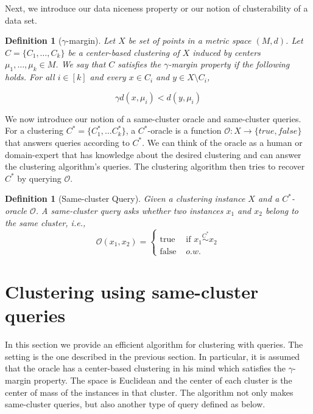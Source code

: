 \documentclass[12pt]{article}
\newcommand{\mc}{\mathcal}
\newtheorem{definition}[theorem]{Definition}
\begin{document}
Next, we introduce our data niceness property or our notion of clusterability of a data set.

\begin{definition}[$\gamma$-margin]
\label{defn:alphacp}
Let $X$ be set of points in a metric space $(M, d)$. Let $C = \{C_1, \ldots, C_k\}$ be a center-based clustering of $X$ induced by centers $\mu_1, \ldots, \mu_k \in M$. We say that $C$ satisfies the $\gamma$-margin property if the following holds. For all $i \in [k]$ and every $x \in C_i$ and $y \in X \setminus C_i$,

$$\gamma d(x, \mu_i) < d(y, \mu_i)$$
\end{definition}


We now introduce our notion of a same-cluster oracle and same-cluster queries. For a clustering $C^*=\{ C^*_1, \ldots C^*_k\}$, a $C^*$-oracle is a function ${\mc O} : X \rightarrow \{true, false\}$ that answers queries according to $C^*$. We can think of the oracle as a human or domain-expert that has knowledge about the desired clustering and can answer the clustering algorithm's queries. The clustering algorithm then tries to recover $C^*$ by querying $\mc O$.

\begin{definition}[Same-cluster Query]
Given a clustering instance $X$ and a $C^*$-oracle $\mc O$. A same-cluster query asks whether two instances $x_1$ and $x_2$ belong to the same cluster, i.e., 
$$\mc O(x_1, x_2) = \left\{
	\begin{array}{ll}
		\mbox{true }  & \mbox{if } x_1 \overset{C^*}{\sim} x_2   \\
		\mbox{false } & o.w. 
	\end{array}
\right. $$
\end{definition}

\section{Clustering using same-cluster queries}
\label{section:clusteringWithQuery}

In this section we provide an efficient algorithm for clustering with queries. The setting is the one described in the previous section. In particular, it is assumed that the oracle has a center-based clustering in his mind which satisfies the $\gamma$-margin property. The space is Euclidean and the center of each cluster is the center of mass of the instances in that cluster. The algorithm not only makes same-cluster queries, but also another type of query defined as below.%
\end{document}

